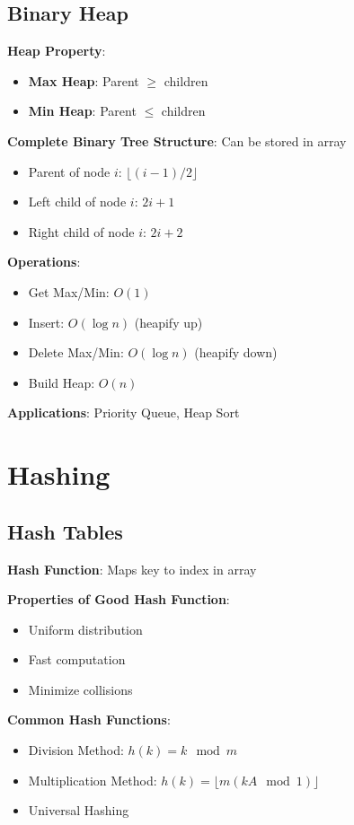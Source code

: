 \documentclass[12pt,a4paper]{report}
\begin{document}
\subsection{Binary Heap}
\begin{concept}
\textbf{Heap Property}:
\begin{itemize}
    \item \textbf{Max Heap}: Parent $\geq$ children
    \item \textbf{Min Heap}: Parent $\leq$ children
\end{itemize}

\textbf{Complete Binary Tree Structure}: Can be stored in array
\begin{itemize}
    \item Parent of node $i$: $\lfloor (i-1)/2 \rfloor$
    \item Left child of node $i$: $2i + 1$
    \item Right child of node $i$: $2i + 2$
\end{itemize}

\textbf{Operations}:
\begin{itemize}
    \item Get Max/Min: $O(1)$
    \item Insert: $O(\log n)$ (heapify up)
    \item Delete Max/Min: $O(\log n)$ (heapify down)
    \item Build Heap: $O(n)$
\end{itemize}

\textbf{Applications}: Priority Queue, Heap Sort
\end{concept}

\section{Hashing}

\subsection{Hash Tables}
\begin{concept}
\textbf{Hash Function}: Maps key to index in array

\textbf{Properties of Good Hash Function}:
\begin{itemize}
    \item Uniform distribution
    \item Fast computation
    \item Minimize collisions
\end{itemize}

\textbf{Common Hash Functions}:
\begin{itemize}
    \item Division Method: $h(k) = k \mod m$
    \item Multiplication Method: $h(k) = \lfloor m(kA \mod 1) \rfloor$
    \item Universal Hashing
\end{itemize}
\end{concept}
\end{document}
